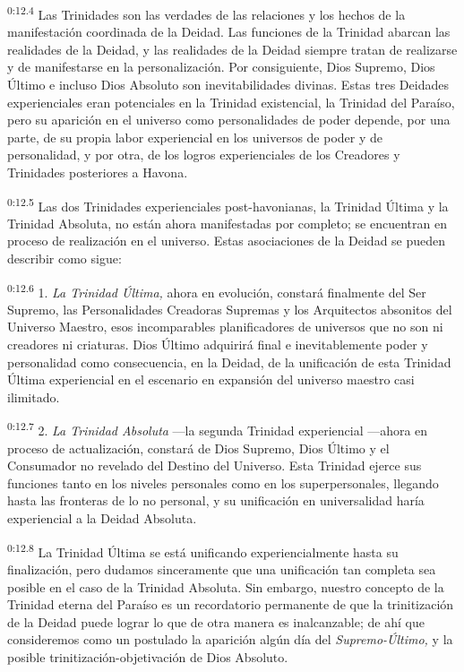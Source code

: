 \par
\textsuperscript{0:12.4} Las Trinidades son las verdades de las relaciones y los hechos de la manifestación coordinada de la Deidad. Las funciones de la Trinidad abarcan las realidades de la Deidad, y las realidades de la Deidad siempre tratan de realizarse y de manifestarse en la personalización. Por consiguiente, Dios Supremo, Dios Último e incluso Dios Absoluto son inevitabilidades divinas. Estas tres Deidades experienciales eran potenciales en la Trinidad existencial, la Trinidad del Paraíso, pero su aparición en el universo como personalidades de poder depende, por una parte, de su propia labor experiencial en los universos de poder y de personalidad, y por otra, de los logros experienciales de los Creadores y Trinidades posteriores a Havona.

\par
\textsuperscript{0:12.5} Las dos Trinidades experienciales post-havonianas, la Trinidad Última y la Trinidad Absoluta, no están ahora manifestadas por completo; se encuentran en proceso de realización en el universo. Estas asociaciones de la Deidad se pueden describir como sigue:

\par
\textsuperscript{0:12.6} 1. \textit{La Trinidad Última,} ahora en evolución, constará finalmente del Ser Supremo, las Personalidades Creadoras Supremas y los Arquitectos absonitos del Universo Maestro, esos incomparables planificadores de universos que no son ni creadores ni criaturas. Dios Último adquirirá final e inevitablemente poder y personalidad como consecuencia, en la Deidad, de la unificación de esta Trinidad Última experiencial en el escenario en expansión del universo maestro casi ilimitado.

\par
\textsuperscript{0:12.7} 2. \textit{La Trinidad Absoluta} ---la segunda Trinidad experiencial ---ahora en proceso de actualización, constará de Dios Supremo, Dios Último y el Consumador no revelado del Destino del Universo. Esta Trinidad ejerce sus funciones tanto en los niveles personales como en los superpersonales, llegando hasta las fronteras de lo no personal, y su unificación en universalidad haría experiencial a la Deidad Absoluta.

\par
\textsuperscript{0:12.8} La Trinidad Última se está unificando experiencialmente hasta su finalización, pero dudamos sinceramente que una unificación tan completa sea posible en el caso de la Trinidad Absoluta. Sin embargo, nuestro concepto de la Trinidad eterna del Paraíso es un recordatorio permanente de que la trinitización de la Deidad puede lograr lo que de otra manera es inalcanzable; de ahí que consideremos como un postulado la aparición algún día del \textit{Supremo-Último,} y la posible trinitización-objetivación de Dios Absoluto.

